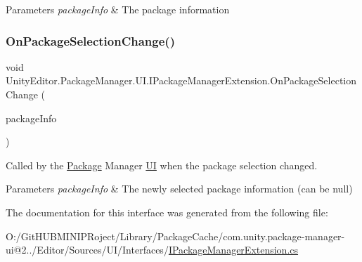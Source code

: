 \begin{DoxyParams}{Parameters}
{\em package\+Info} & The package information\\
\hline
\end{DoxyParams}
\mbox{\label{interface_unity_editor_1_1_package_manager_1_1_u_i_1_1_i_package_manager_extension_acc9b57b0146dac8d56f457c3a35d64a5}} 
\subsubsection{\texorpdfstring{OnPackageSelectionChange()}{OnPackageSelectionChange()}}
{\footnotesize\ttfamily void Unity\+Editor.\+Package\+Manager.\+U\+I.\+I\+Package\+Manager\+Extension.\+On\+Package\+Selection\+Change (\begin{DoxyParamCaption}\item[{Package\+Manager.\+Package\+Info}]{package\+Info }\end{DoxyParamCaption})}



Called by the \mbox{\hyperlink{class_unity_editor_1_1_package_manager_1_1_u_i_1_1_package}{Package}} Manager \mbox{\hyperlink{namespace_unity_editor_1_1_package_manager_1_1_u_i}{UI}} when the package selection changed. 


\begin{DoxyParams}{Parameters}
{\em package\+Info} & The newly selected package information (can be null)\\
\hline
\end{DoxyParams}


The documentation for this interface was generated from the following file\+:\begin{DoxyCompactItemize}
\item 
O\+:/\+Git\+H\+U\+B\+M\+I\+N\+I\+P\+Roject/\+Library/\+Package\+Cache/com.\+unity.\+package-\/manager-\/ui@2../\+Editor/\+Sources/\+U\+I/\+Interfaces/\mbox{\hyperlink{_i_package_manager_extension_8cs}{I\+Package\+Manager\+Extension.\+cs}}\end{DoxyCompactItemize}
